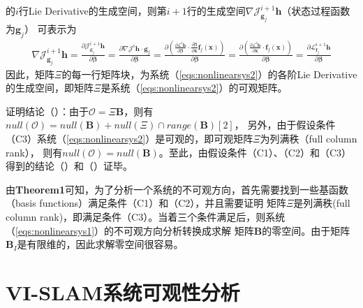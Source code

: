 \documentclass{article}
\begin{document}
的$i$行Lie Derivative的生成空间，则第$i+1$行的生成空间$\nabla\mathcal{J}_{\textbf{g}_j}^{i+1}\textbf{h}$（状态过程函数为$\textbf{g}_j$）
可表示为
\begin{equation}
    \begin{array}{c}
        \nabla\mathcal{J}_{\textbf{g}_j}^{i+1}\textbf{h}=\frac{\partial\mathcal{J}_{\textbf{g}_j}^{i+1}\textbf{h}}{\partial\mathbf{\beta}}
        =\frac{\partial\nabla\mathcal{J}^i\textbf{h}\cdot\textbf{g}_j}{\partial\mathbf{\beta}}
        =\frac{\partial({\frac{\partial\mathcal{L}^i\textbf{h}}{\partial\mathbf{\beta}}}\cdot{{\frac{\partial\mathbf{\beta}}{\partial\textbf{x}}}{\textbf{f}_j}(\textbf{x})})}{\partial\mathbf{\beta}}
        =\frac{\partial({\frac{\partial\mathcal{L}^i\textbf{h}}{\partial{\textbf{x}}}}\cdot{\textbf{f}_j(\textbf{x})})}{\partial\mathbf{\beta}}
        =\frac{\partial\mathcal{L}_{\textbf{f}_j}^{i+1}\textbf{h}}{\partial\mathbf{\beta}}
    \end{array}
\end{equation}
因此，矩阵$\Xi$的每一行矩阵块，为系统（\ref{eqs:nonlinearsys2}）的各阶Lie Derivative的生成空间，即矩阵$\Xi$是系统（\ref{eqs:nonlinearsys2}）的可观矩阵。
\par
证明结论（）：由于$\mathcal{O}=\Xi\textbf{B}$，则有$null(\mathcal{O})=null(\textbf{B})+null(\Xi)\cap{range(\textbf{B})}$$\left[2\right]$，
另外，由于假设条件（C3）系统（\ref{eqs:nonlinearsys2}）是可观的，即可观矩阵$\Xi$为列满秩（full column rank），
则有$null(\mathcal{O})=null(\textbf{B})$。至此，由假设条件（C1）、（C2）和（C3）得到的结论（）和（）证毕。
\par
由\textbf{Theorem1}可知，为了分析一个系统的不可观方向，首先需要找到一些基函数（basis functions）满足条件（C1）和（C2），并且需要证明
矩阵$\Xi$是列满秩(full column rank)，即满足条件（C3）。当着三个条件满足后，则系统（\ref{eqs:nonlinearsys1}）的不可观方向分析转换成求解
矩阵$\textbf{B}$的零空间。由于矩阵$\textbf{B}_I$是有限维的，因此求解零空间很容易。

\section{VI-SLAM系统可观性分析}
\end{document}
